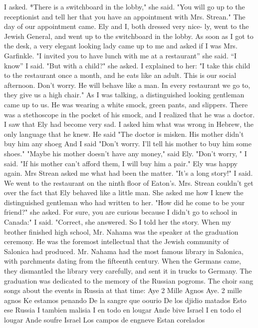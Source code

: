 I asked.
*There is a switchboard in the lobby," she said.
"You will go up 
to the receptionist and tell her that you have an appointment with Mrs.
Strean."
The day of our appointment came.
Ely and I, both dressed very nice-
ly, went to the Jewish General, and went up to the switchboard in the 
lobby.
As soon as I got to the desk, a very elegant looking lady came 
up to me and asked if I was Mrs.
Garfinkle.
"I invited you to have lunch with me at a restaurant” she said.
“I know” I said.
"But with a child?"
she asked.
I explained to her: "I take this child to the restaurant once a 
month, and he eats like an adult.
This is our social afternoon.
Don't 
worry.
He will behave like a man.
In every restaurant we go to, they 
give us a high chair."
As I was talking, a distinguished looking gentleman came up to us.
He was wearing a white smock, green pants, and slippers.
There was a 
stethoscope in the pocket of his smock, and I realized that he was a 
doctor.
I saw that Ely had become very sad.
I asked him what was wrong in 
Hebrew, the only language that he knew.
He said "The doctor is misken.
His mother didn't buy him any shoeg 
And I said "Don't worry.
I'll tell his mother to buy him some 
shoes."
"Maybe his mother doesn't have any money," said Ely.
"Don't worry, " I said.
"If his mother can't afford them, I will 
buy him a pair."
Ely was happy again.
Mrs Strean asked me what had been 
the matter.
"It's a long story!"
I said.
We went to the restaurant on the ninth floor of Eaton's.
Mrs.
Strean couldn't get over the fact that Ely behaved like a little man.
She asked me how I knew the distinguished gentleman who had written to 
her.
"How did he come to be your friend?"
she asked.
For sure, you are curious because I didn't go to school in Canada:" I said.
"Correct, she answered.
So I told her the story.
When my brother finished high school, Mr.
Nahama was the speaker at the graduation ceremony.
He was the foremost 
intellectual that the Jewish community of Salonica had produced.
Mr.
Nahama had the most famous library in Salonica, with parchments dating 
from the fifteenth century.
When the Germans came, they dismantled the 
library very carefully, and sent it in trucks to Germany.
The graduation was dedicated to the memory of the Russian pogroms.
The choir sang songs about the events in Russia at that time: 
Aye 2 Mille Agnos 
Aye.
2 mille agnos 
Ke estamos penando 
De la sangre que oourio 
De los djidio matados 
Esto ese Russia 
I tambien malisia 
I en todo en lougar 
Ande bive Israel 
I en todo el lougar 
Ande soufre Israel 
Los campos de engneve 
Estan corelados 

